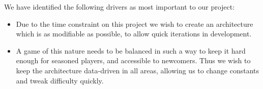We have identified the following drivers as most important to our project:
\begin{itemize}
	\item Due to the time constraint on this project we wish to create an 	
	architecture which is as modifiable as possible, to allow quick iterations
	in development.
	\item A game of this nature needs to be balanced in such a way to keep it
	hard enough for seasoned players, and accessible to newcomers.  Thus we 
	wish to keep the architecture data-driven in all areas, allowing us to
	change constants and tweak difficulty quickly.
\end{itemize}
